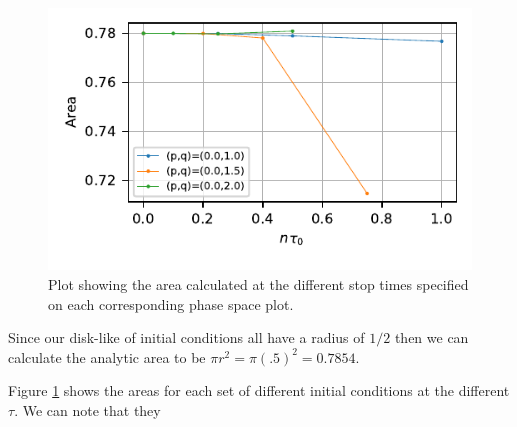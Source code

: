 \begin{figure}
    \centering
    \includegraphics{CodeAndFigures/PendulumPhaseSpaceAreas.pdf}
    \caption{Plot showing the area calculated at the different stop times specified on each corresponding phase space plot.}
    \label{fig:pendAreas}
\end{figure}

Since our disk-like of initial conditions all have a radius of $1/2$ then we can calculate the analytic area to be $\pi r^2 = \pi(.5)^2=0.7854$.

Figure \ref{fig:pendAreas} shows the areas for each set of different initial conditions at the different $\tau$. We can note that they   